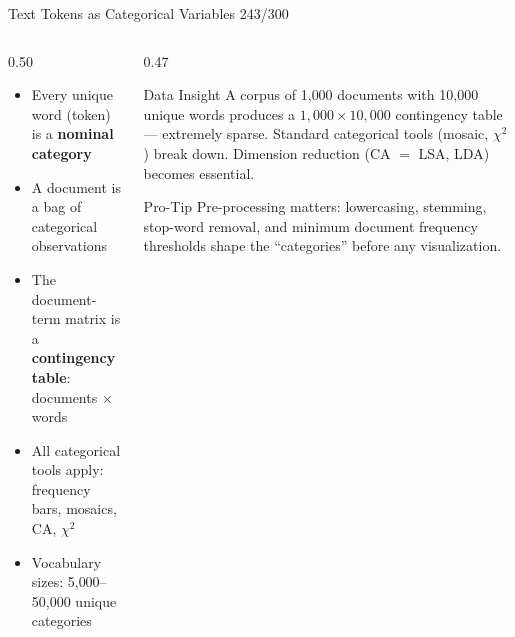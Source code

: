 \documentclass[10pt]{beamer}
\newcommand{\smark}[1]{\hfill{\scriptsize\color{codegray}#1}}
\begin{document}
\begin{frame}{Text Tokens as Categorical Variables}
\smark{243/300}
\begin{columns}[T]
\begin{column}{0.50\textwidth}
\begin{itemize}
    \item Every unique word (token) is a \textbf{nominal category}
    \item A document is a bag of categorical observations
    \item The document-term matrix is a \textbf{contingency table}: documents $\times$ words
    \item All categorical tools apply: frequency bars, mosaics, CA, $\chi^2$
    \item Vocabulary sizes: 5{,}000--50{,}000 unique categories
\end{itemize}
\end{column}
\begin{column}{0.47\textwidth}
\begin{exampleblock}{Data Insight}
    \scriptsize A corpus of 1{,}000 documents with 10{,}000 unique words produces a $1{,}000 \times 10{,}000$ contingency table --- extremely sparse. Standard categorical tools (mosaic, $\chi^2$) break down. Dimension reduction (CA $=$ LSA, LDA) becomes essential.
\end{exampleblock}
\vspace{0.1cm}
\begin{alertblock}{Pro-Tip}
    \scriptsize Pre-processing matters: lowercasing, stemming, stop-word removal, and minimum document frequency thresholds shape the ``categories'' before any visualization.
\end{alertblock}
\end{column}
\end{columns}
\end{frame}
\end{document}
